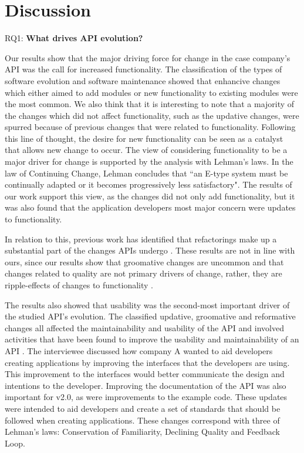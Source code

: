 \documentclass{sig-alternate}
\begin{document}
 

\section{Discussion} \label{discussion}

\noindent
RQ1: \textbf{What drives API evolution?}
\smallskip

Our results show that the major driving force for change in the case company's API was the call for increased functionality. The classification of the types of software evolution and software maintenance showed that enhancive changes which either aimed to add modules or new functionality to existing modules were the most common. We also think that it is interesting to note that a majority of the changes which did not affect functionality, such as the updative changes, were spurred because of previous changes that were related to functionality. Following this line of thought, the desire for new functionality can be seen as a catalyst that allows new change to occur. The view of considering functionality to be a major driver for change is supported by the analysis with Lehman's laws. In the law of Continuing Change, Lehman concludes that ``an E-type system must be continually adapted or it becomes progressively less satisfactory". The results of our work support this view, as the changes did not only add functionality, but it was also found that the application developers most major concern were updates to functionality. 

In relation to this, previous work has identified that refactorings make up a substantial part of the changes APIs undergo \cite{dig2005role, dig2006apis, henkel2005catchup, xing2006refactoring}. These results are not in line with ours, since our results show that groomative changes are uncommon and that changes related to quality are not primary drivers of change, rather, they are ripple-effects of changes to functionality \cite{robbes2012developers}.

The results also showed that usability was the second-most important driver of the studied API's evolution. The classified updative, groomative and reformative changes all affected the maintainability and usability of the API and involved activities that have been found to improve the usability and maintainability of an API \cite{afonso2012evaluating, clarke2004measuring, piccioni2013empirical, shi2011empirical}. The interviewee discussed how company A wanted to aid developers creating applications by improving the interfaces that the developers are using. This improvement to the interfaces would better communicate the design and intentions to the developer. Improving the documentation of the API was also important for v2.0, as were improvements to the example code. These updates were intended to aid developers and create a set of standards that should be followed when creating applications. These changes correspond with three of Lehman's laws: Conservation of Familiarity, Declining Quality and Feedback Loop.  
\end{document}
